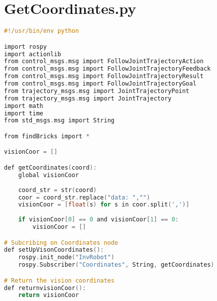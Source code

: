 \section{GetCoordinates.py}\label{sec:GetCoordinates}
\begin{lstlisting}[language=C]
#!/usr/bin/env python

import rospy
import actionlib
from control_msgs.msg import FollowJointTrajectoryAction
from control_msgs.msg import FollowJointTrajectoryFeedback
from control_msgs.msg import FollowJointTrajectoryResult
from control_msgs.msg import FollowJointTrajectoryGoal
from trajectory_msgs.msg import JointTrajectoryPoint
from trajectory_msgs.msg import JointTrajectory
import math
import time
from std_msgs.msg import String

from findBricks import *

visionCoor = []

def getCoordinates(coord):    
    global visionCoor
    
    coord_str = str(coord)
    coor = coord_str.replace("data: ","")
    visionCoor = [float(s) for s in coor.split(',')]
    
    if visionCoor[0] == 0 and visionCoor[1] == 0:
        visionCoor = []

# Subcribing on Coordinates node
def setUpVisonCoordinates():
    rospy.init_node("InvRobot")
    rospy.Subscriber("Coordinates", String, getCoordinates)

# Return the vision coordinates
def returnvisionCoor():
    return visionCoor
\end{lstlisting}
\newpage
